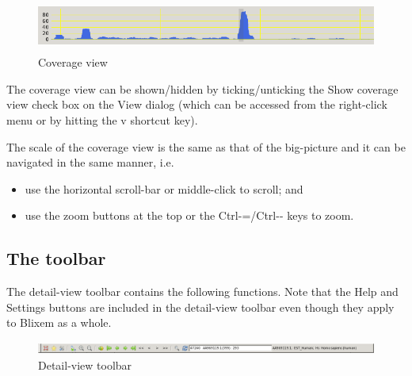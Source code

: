 \documentclass[letterpaper]{article}
\newcommand\liststyleLiv{%
\renewcommand\labelitemi{{\textbullet}}
\renewcommand\labelitemii{${\circ}$}
\renewcommand\labelitemiii{${\blacksquare}$}
\renewcommand\labelitemiv{{\textbullet}}
}
\begin{document}
\begin{figure}
\centering
\color[rgb]{0.30980393,0.5058824,0.7411765}
\includegraphics[width=15.24cm,height=1.736cm]{img_view_coverage.png}
\caption{Coverage view}
\end{figure}

\bigskip

{The coverage view can be shown/hidden by ticking/unticking the
{\textquotesingle}Show coverage view{\textquotesingle} check box on the
View dialog (which can be accessed from the right-click menu or by
hitting the {\textquotesingle}v{\textquotesingle} shortcut key).}

\bigskip

{The scale of the coverage view is the same as that of the big-picture
and it can be navigated in the same manner, i.e. }

\liststyleLiv
\begin{itemize}
\item {
use the horizontal scroll-bar or middle-click to scroll; and }
\item {
use the zoom buttons at the top or the Ctrl-=/Ctrl-{}- keys to zoom.}
\end{itemize}

{\color[rgb]{0.30980393,0.5058824,0.7411765}\subsection[The toolbar]{The toolbar}}
{The detail-view toolbar contains the following functions. Note that the
Help and Settings buttons are included in the detail-view toolbar even
though they apply to Blixem as a whole.}

\begin{figure}
\centering
\color[rgb]{0.30980393,0.5058824,0.7411765}
\includegraphics[width=15.24cm,height=0.416cm]{img_toolbar.png}
\caption{Detail-view toolbar}
\end{figure}
\end{document}
